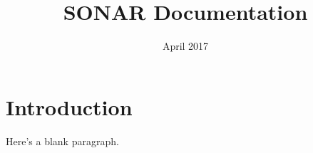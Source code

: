 \documentclass{article}
\title{SONAR Documentation}
\author{}
\date{April 2017}
\begin{document}
\maketitle

\section{Introduction}
\par Here's a blank paragraph.
\end{document}
